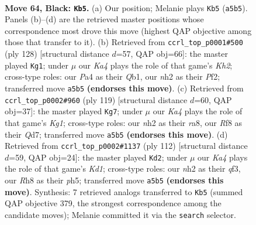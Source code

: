 \documentclass[11pt]{article}
\begin{document}
\clearpage

\begin{figure}[p]\centering
\begin{subfigure}{0.46\textwidth}\centering
\resizebox{\linewidth}{!}{%
\newchessgame
\chessboard[
  setfen={5r1r/p5p1/4Q2p/k2p3P/p2P2P1/1q2P2K/7N/4b3 b - - 37 64},
  showmover=false,
  pgfstyle=straightmove, color=movearrow, markmove={a5-b5}
]}
\caption{}
\end{subfigure}\hfill
\begin{subfigure}{0.46\textwidth}\centering
\resizebox{\linewidth}{!}{%
\newchessgame
\chessboard[
  setfen={8/1r3pk1/1P4p1/2q4p/3p3P/pR4P1/P4P1K/1Q6 w - - 15 65},
  showmover=false,
  pgfstyle=straightmove, color=movearrow, markmove={h2-g1}
]}
\caption{}
\end{subfigure}
\\[4pt]
\begin{subfigure}{0.46\textwidth}\centering
\resizebox{\linewidth}{!}{%
\newchessgame
\chessboard[
  setfen={R5k1/3q1p2/2p1r1p1/7p/1P1p3P/3Q2P1/4PP2/5K2 b - - 62 60},
  showmover=false,
  pgfstyle=straightmove, color=movearrow, markmove={g8-g7}
]}
\caption{}
\end{subfigure}\hfill
\begin{subfigure}{0.46\textwidth}\centering
\resizebox{\linewidth}{!}{%
\newchessgame
\chessboard[
  setfen={5r2/4Qp1k/3R1Pp1/6Pp/1pP4P/p4q2/P1P5/3K4 w - - 7 57},
  showmover=false,
  pgfstyle=straightmove, color=movearrow, markmove={d1-d2}
]}
\caption{}
\end{subfigure}
\caption{\textbf{Move 64, Black: \texttt{Kb5}.} (a) Our position; Melanie plays \texttt{Kb5} (\texttt{a5b5}). Panels (b)--(d) are the retrieved master positions whose correspondence most drove this move (highest QAP objective among those that transfer to it). (b) Retrieved from \texttt{ccrl\_top\_p0001\#500} (ply 128) [structural distance $d$=57, QAP obj=66]: the master played \texttt{Kg1}; under $\mu$ our \emph{Ka4} plays the role of that game's \emph{Kh2}; cross-type roles: our \emph{P}a4 as their \emph{Q}b1, our \emph{n}h2 as their \emph{P}f2; transferred move \texttt{a5b5} \textbf{(endorses this move)}. (c) Retrieved from \texttt{ccrl\_top\_p0002\#960} (ply 119) [structural distance $d$=60, QAP obj=37]: the master played \texttt{Kg7}; under $\mu$ our \emph{Ka4} plays the role of that game's \emph{Kg1}; cross-type roles: our \emph{n}h2 as their \emph{r}a8, our \emph{R}f8 as their \emph{Q}d7; transferred move \texttt{a5b5} \textbf{(endorses this move)}. (d) Retrieved from \texttt{ccrl\_top\_p0002\#1137} (ply 112) [structural distance $d$=59, QAP obj=24]: the master played \texttt{Kd2}; under $\mu$ our \emph{Ka4} plays the role of that game's \emph{Kd1}; cross-type roles: our \emph{n}h2 as their \emph{q}f3, our \emph{R}h8 as their \emph{p}h5; transferred move \texttt{a5b5} \textbf{(endorses this move)}. Synthesis: 7 retrieved analogs transferred to \texttt{Kb5} (summed QAP objective 379, the strongest correspondence among the candidate moves); Melanie committed it via the \texttt{search} selector.}
\label{fig:thought-m127}
\end{figure}
\end{document}
